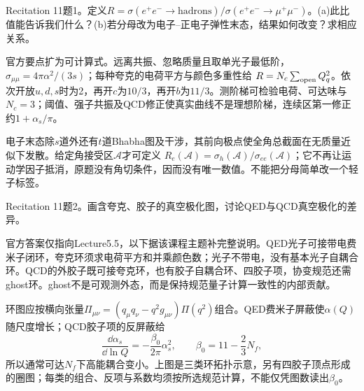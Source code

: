 \begin{exercise}\label{ex:rec-11-1}
Recitation 11题1。定义$R=\sigma(e^+e^-\to\mathrm{hadrons})/\sigma(e^+e^-\to\mu^+\mu^-)$。(a)此比值能告诉我们什么？(b)若分母改为电子--正电子弹性末态，结果如何改变？求相应关系。
\end{exercise}
\begin{solution}
官方要点扩为可计算式。远离共振、忽略质量且取单光子最低阶，$\sigma_{\mu\mu}=4\pi\alpha^2/(3s)$；每种夸克的电荷平方与颜色多重性给
$R=N_c\sum_{\rm open}Q_q^2$。依次开放$u,d,s$时为2，再开$c$为$10/3$，再开$b$为$11/3$。测阶梯可检验电荷、可达味与$N_c=3$；阈值、强子共振及QCD修正使真实曲线不是理想阶梯，连续区第一修正约$1+\alpha_s/\pi$。

电子末态除$s$道外还有$t$道Bhabha图及干涉，其前向极点使全角总截面在无质量近似下发散。给定角接受区$\mathcal A$才可定义
$R_e(\mathcal A)=\sigma_h(\mathcal A)/\sigma_{ee}(\mathcal A)$；它不再让运动学因子抵消，原题没有角切条件，因而没有唯一数值。不能把分母简单改一个轻子标签。
\end{solution}
\begin{exercise}\label{ex:rec-11-2}
Recitation 11题2。画含夸克、胶子的真空极化图，讨论QED与QCD真空极化的差异。
\end{exercise}
\begin{solution}
官方答案仅指向Lecture5.5，以下据该课程主题补完整说明。QED光子可接带电费米子闭环，夸克环须求电荷平方和并乘颜色数；光子不带电，没有基本光子自耦合环。QCD的外胶子既可接夸克环，也有胶子自耦合环、四胶子项，协变规范还需ghost环。ghost不是可观测外态，而是保持规范量子计算一致性的内部贡献。
\begin{center}\end{center}
环图应按横向张量$\Pi_{\mu\nu}=(q_\mu q_\nu-q^2g_{\mu\nu})\Pi(q^2)$组合。QED费米子屏蔽使$\alpha(Q)$随尺度增长；QCD胶子项的反屏蔽给
\begin{equation}\frac{\dd\alpha_s}{\dd\ln Q}=-\frac{\beta_0}{2\pi}\alpha_s^2,\qquad \beta_0=11-\frac23N_f,\end{equation}
所以通常可达$N_f$下高能耦合变小。上图是三类环拓扑示意，另有四胶子顶点形成的圈图；每类的组合、反项与系数均须按所选规范计算，不能仅凭图数读出$\beta_0$。
\end{solution}
